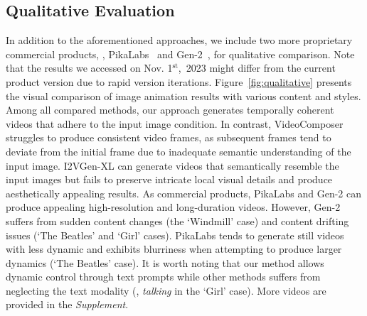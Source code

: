 \begin{table}[t]
  \caption{Quantitative comparisons with state-of-the-art open-domain image-to-video generation methods on UCF-101 and MSR-VTT for the zero-shot setting.}%
  \label{tab:i2v_quan}
  \vspace{-0.8em}
\vspace{-4mm}
\end{table}

\subsection{Qualitative Evaluation}
 In addition to the aforementioned approaches, we include two more proprietary commercial products, \ie, PikaLabs~\cite{PikaLabs} and Gen-2~\cite{Gen-2}, for qualitative comparison. Note that the results we accessed on Nov. 1$^{\text{st}}$,~2023 might differ from the current product version due to rapid version iterations. Figure~\ref{fig:qualitative} presents the visual comparison of image animation results with various content and styles. Among all compared methods, our approach generates temporally coherent videos that adhere to the input image condition. In contrast, VideoComposer struggles to produce consistent video frames, as subsequent frames tend to deviate from the initial frame due to inadequate semantic understanding of the input image. I2VGen-XL can generate videos that semantically resemble the input images but fails to preserve intricate local visual details and produce aesthetically appealing results. As commercial products, PikaLabs and Gen-2 can produce appealing high-resolution and long-duration videos. However, Gen-2 suffers from sudden content changes (the `Windmill' case) and content drifting issues (`The Beatles' and `Girl' cases). PikaLabs tends to generate still videos with less dynamic and exhibits blurriness when attempting to produce larger dynamics (`The Beatles' case). It is worth noting that our method allows dynamic control through text prompts while other methods suffers from neglecting the text modality (\eg, \emph{talking} in the `Girl' case). More videos are provided in the \emph{Supplement}.

